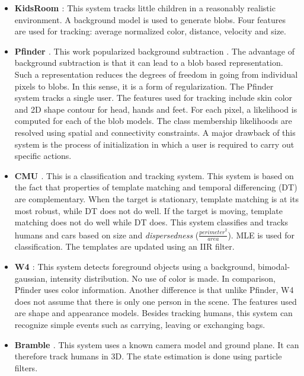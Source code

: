 \documentclass[12pt,letterpaper,doublespaced,ETD,proposal]{gt-ece-thesis}
\begin{document}
\begin{Body}
\begin{itemize}
\item \textbf{KidsRoom \cite{1997_CNF_ClosedWorldTracking_Intille}}:  This system tracks little children in a reasonably realistic environment.  A background model is used to generate blobs.  Four features are used for tracking: average normalized color, distance, velocity and size.  

\item \textbf{Pfinder \cite{1997_JNL_Pfinder_Wren}}.  This work popularized background subtraction \cite{2006_JNL_SURVEYtrk_Yilmaz}.  The advantage of background subtraction is that it can lead to a blob based representation.  Such a representation reduces the degrees of freedom in going from individual pixels to blobs.  In this sense, it is a form of regularization.  The Pfinder system tracks a single user.  The features used for tracking include skin color and 2D shape contour for head, hands and feet.  For each pixel, a likelihood is computed for each of the blob models.  The class membership likelihoods are resolved using spatial and connectivity constraints.  A major drawback of this system is the process of initialization in which a user is required to carry out specific actions.

\item \textbf{CMU \cite{1998_CNF_Tracking_Lipton}}.  This is a classification and tracking system.  This system is based on the fact that properties of template matching and temporal differencing (DT) are complementary.  When the target is stationary, template matching is at its most robust, while DT does not do well.  If the target is moving, template matching does not do well while DT does.  This system classifies and tracks humans and cars based on size and \emph{dispersedness} ($\frac{{perimeter}^2}{area}$).  MLE is used for classification.  The templates are updated using an IIR filter.

\item \textbf{W4 \cite{2000_JNL_W4_Haritaoglu}}:  This system detects foreground objects using a background, bimodal-gaussian, intensity distribution.  No use of color is made.  In comparison, Pfinder uses color information.  Another difference is that unlike Pfinder, W4 does not assume that there is only one person in the scene.  The features used are shape and appearance models.  Besides tracking humans, this system can recognize simple events such as carrying, leaving or exchanging bags.

\item \textbf{Bramble \cite{2001_CNF_TRKhuman_Isard}}.  This system uses a known camera model and ground plane.  It can therefore track humans in 3D.  The state estimation is done using particle filters.  


\end{itemize}
\end{Body}
\end{document}
